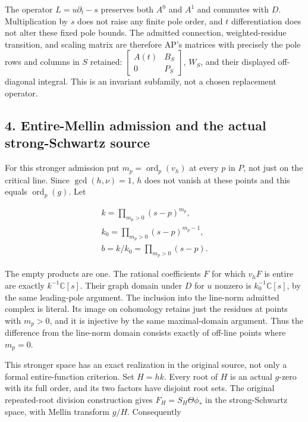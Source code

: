 The operator \(L=u\partial_t-s\) preserves both \(A^0\) and \(A^1\) and commutes
with \(D\). Multiplication by \(s\) does not raise any finite pole order, and
\(t\) differentiation does not alter these fixed pole bounds. The admitted
connection, weighted-residue transition, and scaling matrix are therefore
AP's matrices with precisely the pole rows and columns in \(S\) retained:
\(\begin{bmatrix}A(t)&B_S\\0&P_S\end{bmatrix}\), \(W_S\), and their displayed off-diagonal integral.
This is an invariant subfamily, not a chosen replacement operator.


\subsection*{4. Entire-Mellin admission and the actual strong-Schwartz source}


For this stronger admission put \(m_p=\operatorname{ord}_p(v_h)\) at every \(p\) in \(P\), not
just on the critical line. Since \(\gcd(h,\nu)=1\), \(h\) does not vanish at these
points and this equals \(\operatorname{ord}_p(g)\). Let


\[
\begin{gathered}
k=\prod_{m_p>0}(s-p)^{m_p}, \\
k_0=\prod_{m_p>0}(s-p)^{m_p-1}, \\
b=k/k_0=\prod_{m_p>0}(s-p).
\end{gathered}
\]


The empty products are one. The rational coefficients \(F\) for which \(v_hF\)
is entire are exactly \(k^{-1}\mathbb C[s]\). Their graph domain under \(D\) for
\(u\) nonzero is \(k_0^{-1}\mathbb C[s]\), by the same leading-pole argument.
The inclusion into the line-norm admitted complex is literal. Its image
on cohomology retains just the residues at points with \(m_p>0\), and it is
injective by the same maximal-domain argument. Thus the difference from
the line-norm domain consists exactly of off-line points where \(m_p=0\).


This stronger space has an exact realization in the original source,
not only a formal entire-function criterion. Set \(H=hk\). Every root
of \(H\) is an actual \(g\)-zero with its full order, and its two factors have
disjoint root sets. The original repeated-root division construction
gives \(F_H=S_H\Theta\phi_*\) in the strong-Schwartz space, with Mellin
transform \(g/H\). Consequently


